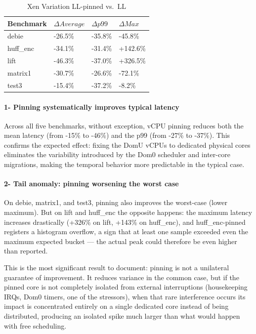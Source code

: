 \begin{table}
\centering
\caption{Xen Variation LL-pinned vs.\ LL}
\label{tab:xen:ll-pinned-vs-ll}
\begin{tabularx}{\linewidth}{@{}YYYY@{}}
\toprule
\textbf{Benchmark} & \textbf{$\Delta Average$} & \textbf{$\Delta p99$} & \textbf{$\Delta Max$}\tabularnewline
\midrule
debie & -26.5\% & -35.8\% & -45.8\%\tabularnewline
huff\_enc & -34.1\% & -31.4\% & +142.6\%\tabularnewline
lift & -46.3\% & -37.0\% & +326.5\%\tabularnewline
matrix1 & -30.7\% & -26.6\% & -72.1\%\tabularnewline
test3 & -15.4\% & -37.2\% & -8.2\%\tabularnewline
\bottomrule
\end{tabularx}
\end{table}

\paragraph{1- Pinning systematically improves typical
latency}\label{pinning-systematically-improves-typical-latency}

Across all five benchmarks, without exception, vCPU pinning reduces both
the mean latency (from -15\% to -46\%) and the p99 (from -27\% to
-37\%). This confirms the expected effect: fixing the DomU vCPUs to
dedicated physical cores eliminates the variability introduced by the
Dom0 scheduler and inter-core migrations, making the temporal behavior
more predictable in the typical case.

\paragraph{2- Tail anomaly: pinning worsening the worst
case}\label{tail-anomaly-pinning-worsening-the-worst-case}

On debie, matrix1, and test3, pinning also improves the worst-case
(lower maximum). But on lift and huff\_enc the opposite happens: the
maximum latency increases drastically (+326\% on lift, +143\% on
huff\_enc), and huff\_enc-pinned registers a histogram overflow, a sign
that at least one sample exceeded even the maximum expected bucket ---
the actual peak could therefore be even higher than reported.

This is the most significant result to document: pinning is not a
unilateral guarantee of improvement. It reduces variance in the common
case, but if the pinned core is not completely isolated from external
interruptions (housekeeping IRQs, Dom0 timers, one of the stressors),
when that rare interference occurs its impact is concentrated entirely
on a single dedicated core instead of being distributed, producing an
isolated spike much larger than what would happen with free scheduling.

